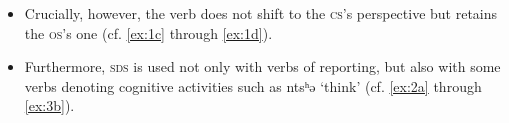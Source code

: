 \documentclass[oneside,a4paper,11pt]{article}
\newcommand{\ipa}[1]{{\phon #1}} %
\newcommand{\ipapl}[1]{{\phondroit #1}}
\begin{document}
\begin{itemize}

\item Crucially, however, the verb does not shift to the \textsc{cs}'s perspective but retains the \textsc{os}'s one (cf. \ref{ex:1c} through \ref{ex:1d}).

\end{itemize}


% 
% 
% 
% 
% 
% 
% 



\begin{itemize}

\item Furthermore, \textsc{sds} is used not only with verbs of reporting, but also with some verbs denoting cognitive activities such as \ipa{ntsʰə} `think' (cf. \ref{ex:2a} through \ref{ex:3b}).
\end{itemize}
\end{document}
